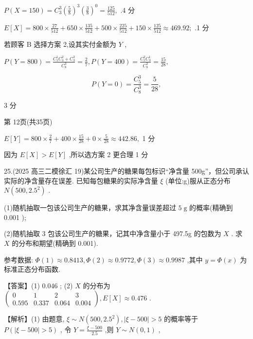 \documentclass[10pt]{article}
\newcommand*\circled[1]{\tikz[baseline=(char.base)]{\node[shape=circle,draw,inner sep=1.5pt] (char) {\small #1};}}
\begin{document}
\(P\left( {X = {150}}\right)  = {C}_{3}^{3}{\left( \frac{5}{8}\right) }^{3}{\left( \frac{3}{8}\right) }^{0} = \frac{125}{512},\) .4 分

\(E\left\lbrack  X\right\rbrack   = {800} \times  \frac{27}{512} + {650} \times  \frac{135}{512} + {500} \times  \frac{225}{512} + {150} \times  \frac{125}{512} \approx  {469.92};\) .1 分

 \circled{2}  若顾客 B 选择方案 2,设其实付金额为 \(Y\) ,

\(P\left( {Y = {800}}\right)  = \frac{{C}_{5}^{1}{C}_{3}^{2} + {C}_{3}^{3}}{{C}_{8}^{3}} = \frac{2}{7},P\left( {Y = {400}}\right)  = \frac{{C}_{5}^{2}{C}_{3}^{1}}{{C}_{8}^{3}} = \frac{15}{28},\)

\[
P\left( {Y = 0}\right)  = \frac{{C}_{5}^{3}}{{C}_{8}^{3}} = \frac{5}{28},
\]

3 分

第 12页(共35页)

\(E\left\lbrack  Y\right\rbrack   = {800} \times  \frac{2}{7} + {400} \times  \frac{15}{28} + 0 \times  \frac{5}{28} \approx  {442.86},\) 1 分

因为 \(E\left\lbrack  X\right\rbrack   > E\left\lbrack  Y\right\rbrack\) ,所以选方案 2 更合理 1 分

25.(2025 高三二模徐汇 19)某公司生产的糖果每包标识“净含量 500g”，但公司承认实际的净含量存在误差. 已知每包糖果的实际净含量 \(\xi\) (单位:g)服从正态分布 \(N\left( {{500},{2.5}^{2}}\right)\) .

(1)随机抽取一包该公司生产的糖果，求其净含量误差超过 \(5\mathrm{\;g}\) 的概率(精确到 0.001 );

(2)随机抽取 3 包该公司生产的糖果，记其中净含量小于 497.5g 的包数为 \(X\) . 求 \(X\) 的分布和期望(精确到 0.001).

参考数据: \(\Phi \left( 1\right)  \approx  {0.8413},\Phi \left( 2\right)  \approx  {0.9772},\Phi \left( 3\right)  \approx  {0.9987}\) ,其中 \(y = \Phi \left( x\right)\) 为标准正态分布函数.

【答案】(1) 0.046 ; (2) \(X\) 的分布为 \(\left( \begin{matrix} 0 & 1 & 2 & 3 \\  {0.595} & {0.337} & {0.064} & {0.004} \end{matrix}\right) ,E\left\lbrack  X\right\rbrack   \approx  {0.476}\) .

【解析】(1) 由题意, \(\xi  \sim  N\left( {{500},{2.5}^{2}}\right) ,\left| {\xi  - {500}}\right|  > 5\) 的概率等于 \(P\left( {\left| {\xi  - {500}}\right|  > 5}\right)\) , 令 \(Y = \frac{\xi  - {500}}{2.5}\) ,则 \(Y \sim  N\left( {0,1}\right)\) ,
\end{document}
